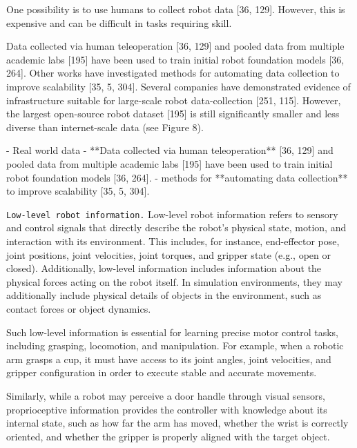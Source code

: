 	
	
	



	One possibility is to use humans to collect robot data [36, 129]. However, this is expensive and can be difficult in tasks requiring skill.

	Data collected via human teleoperation [36, 129] and pooled data from multiple academic labs [195] have been used to train initial robot foundation models [36, 264]. Other works have investigated 	methods for automating data collection to improve scalability [35, 5, 304]. Several companies have demonstrated evidence of infrastructure suitable for large-scale robot data-collection [251, 115]. However, the largest open-source robot dataset [195] is still significantly smaller and less diverse than internet-scale data
	(see Figure 8).
	
	- Real world data
		- **Data collected via human teleoperation** [36, 129] and pooled data from multiple academic labs [195] have been used to train initial robot foundation models [36, 264].
		- methods for **automating data collection** to improve scalability [35, 5, 304].







\texttt{Low-level robot information.}
Low-level robot information refers to sensory and control signals that directly describe the robot's physical state, motion, and interaction with its environment. This includes, for instance, end-effector pose, joint positions, joint velocities, joint torques, and gripper state (e.g., open or closed). Additionally, low-level information includes information about the physical forces acting on the robot itself. In simulation environments, they may additionally include physical details of objects in the environment, such as contact forces or object dynamics.

Such low-level information is essential for learning precise motor control tasks, including grasping, locomotion, and manipulation. For example, when a robotic arm grasps a cup, it must have access to its joint angles, joint velocities, and gripper configuration in order to execute stable and accurate movements.

Similarly, while a robot may perceive a door handle through visual sensors, proprioceptive information provides the controller with knowledge about its internal state, such as how far the arm has moved, whether the wrist is correctly oriented, and whether the gripper is properly aligned with the target object.

